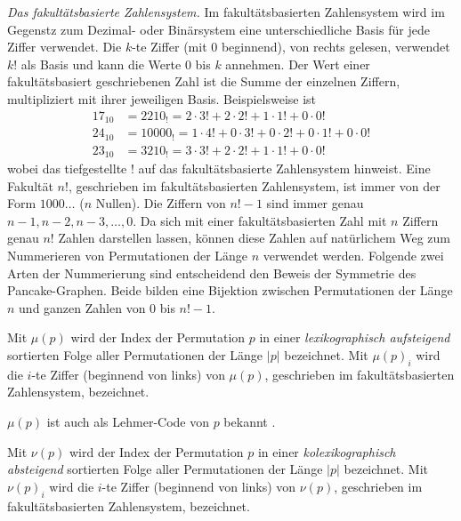 \documentclass[a4paper, 11pt, ngerman]{article}
\begin{document}
\noindent \emph{Das fakultätsbasierte Zahlensystem.} Im fakultätsbasierten Zahlensystem wird im Gegenstz zum Dezimal- oder Binärsystem eine unterschiedliche Basis für jede Ziffer verwendet. Die $k$-te Ziffer (mit 0 beginnend), von rechts gelesen, verwendet $k!$ als Basis und kann die Werte 0 bis $k$ annehmen. Der Wert einer fakultätsbasiert geschriebenen Zahl ist die Summe der einzelnen Ziffern, multipliziert mit ihrer jeweiligen Basis. Beispielsweise ist
\begin{align*}
    17_{10} & = 2210_!   = 2 \cdot 3! + 2 \cdot 2! + 1 \cdot 1! + 0 \cdot 0!             \\
    24_{10} & = 10000_! = 1 \cdot 4! + 0 \cdot 3! + 0 \cdot 2! + 0 \cdot 1! + 0 \cdot 0! \\
    23_{10} & = 3210_!  = 3 \cdot 3! + 2 \cdot 2! + 1 \cdot 1! + 0 \cdot 0!
\end{align*}
wobei das tiefgestellte ! auf das fakultätsbasierte Zahlensystem hinweist. Eine Fakultät $n!$, geschrieben im fakultätsbasierten Zahlensystem, ist immer von der Form $1000\dots$ ($n$ Nullen). Die Ziffern von $n! - 1$ sind immer genau $n-1, n-2, n-3, \dots, 0$.
Da sich mit einer fakultätsbasierten Zahl mit $n$ Ziffern genau $n!$ Zahlen darstellen lassen, können diese Zahlen auf natürlichem Weg zum Nummerieren von Permutationen der Länge $n$ verwendet werden. Folgende zwei Arten der Nummerierung sind entscheidend den Beweis der Symmetrie des Pancake-Graphen. Beide bilden eine Bijektion zwischen Permutationen der Länge $n$ und ganzen Zahlen von 0 bis $n! - 1$.

\begin{definition}
    Mit $\mu(p)$ wird der Index der Permutation $p$ in einer \emph{lexikographisch aufsteigend} sortierten Folge aller Permutationen der Länge $|p|$ bezeichnet. Mit $\mu(p)_i$ wird die $i$-te Ziffer (beginnend von links) von $\mu(p)$, geschrieben im fakultätsbasierten Zahlensystem, bezeichnet.
\end{definition}

$\mu(p)$ ist auch als Lehmer-Code von $p$ bekannt \cite{factorial}.

\begin{definition}
    Mit $\nu(p)$ wird der Index der Permutation $p$ in einer \emph{kolexikographisch absteigend} sortierten Folge aller Permutationen der Länge $|p|$ bezeichnet. Mit $\nu(p)_i$ wird die $i$-te Ziffer (beginnend von links) von $\nu(p)$, geschrieben im fakultätsbasierten Zahlensystem, bezeichnet.
\end{definition}
\end{document}
